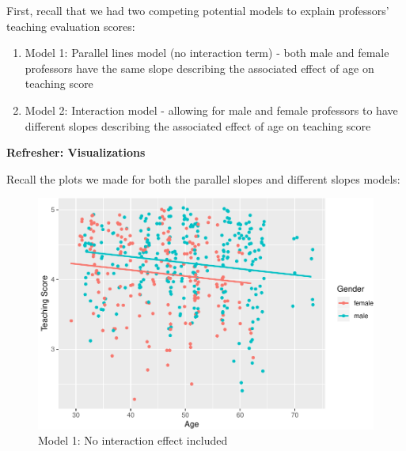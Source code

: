 \documentclass[]{article}
\newenvironment{Shaded}{\begin{snugshade}}{\end{snugshade}}
\newcommand{\KeywordTok}[1]{\textcolor[rgb]{0.13,0.29,0.53}{\textbf{#1}}}
\newcommand{\StringTok}[1]{\textcolor[rgb]{0.31,0.60,0.02}{#1}}
\newcommand{\OperatorTok}[1]{\textcolor[rgb]{0.81,0.36,0.00}{\textbf{#1}}}
\newcommand{\NormalTok}[1]{#1}
\providecommand{\tightlist}{%
  \setlength{\itemsep}{0pt}\setlength{\parskip}{0pt}}
\begin{document}
\begin{Shaded}
\end{Shaded}

First, recall that we had two competing potential models to explain
professors' teaching evaluation scores:

\begin{enumerate}
\def\labelenumi{\arabic{enumi}.}
\tightlist
\item
  Model 1: Parallel lines model (no interaction term) - both male and
  female professors have the same slope describing the associated effect
  of age on teaching score
\item
  Model 2: Interaction model - allowing for male and female professors
  to have different slopes describing the associated effect of age on
  teaching score
\end{enumerate}

\textbf{Refresher: Visualizations}

Recall the plots we made for both the parallel slopes and different
slopes models:

\begin{figure}[H]

{\centering \includegraphics[width=0.85\linewidth]{DAWeek8_files/figure-latex/plot1-1} 

}

\caption{\label{fig:plot1}Model 1: No interaction effect included}\label{fig:plot1}
\end{figure}
\end{document}
